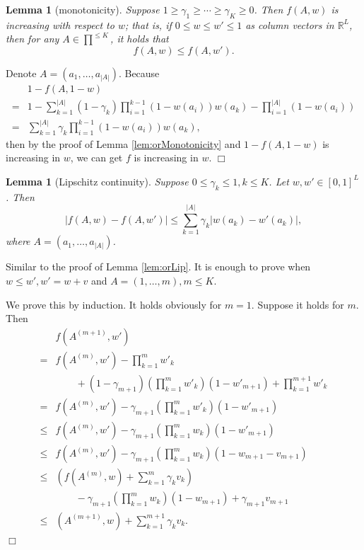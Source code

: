 \documentclass{article}
\newcommand{\RR}{\mathbb{R}}
\newcommand{\abs}[1]{\left| #1 \right|}
\newtheorem{lemma}[theorem]{Lemma}%
\newenvironment{proof}{\noindent {\textbf{Proof. }}}{$\Box$ \medskip}
\begin{document}
\begin{lemma}[monotonicity]
	\label{lem:andMonotonicity}
	Suppose $1 \geq \gamma_1 \geq \cdots \geq \gamma_K \geq 0$. Then $f(A, w)$ is increasing with respect to $w$; that is, if $0 \leq w \leq w' \leq 1$ as column vectors in $\RR^L$, then for any $A \in \prod^{\leq K}$, it holds that
	$$
	f(A, w) \leq f(A, w').
	$$
\end{lemma}
\begin{proof}
	Denote $A = (a_1, \ldots, a_{|A|})$. Because
	\begin{align*}
	&1 - f(A, 1-w) \\
	=& 1- \sum_{k = 1}^{\abs{A}} (1 - \gamma_k) \prod_{i = 1}^{k - 1} (1-w(a_i))w(a_k) - \prod_{i=1}^{\abs{A}}(1-w(a_i))\\
	=& \sum_{k = 1}^{\abs{A}} \gamma_{k} \prod_{i=1}^{k-1} (1 - w(a_i)) w(a_k),
	\end{align*}
	then by the proof of Lemma \ref{lem:orMonotonicity} and $1-f(A,1-w)$ is increasing in $w$, we can get $f$ is increasing in $w$.
\end{proof}

\begin{lemma}[Lipschitz continuity]
	\label{lem:andLip}
	Suppose $0 \leq \gamma_k \leq 1, k \leq K$. Let $w, w'\in [0,1]^{L}$. Then
	$$
	|f(A, w) - f(A, w')| \leq \sum_{k=1}^{|A|} \gamma_k |w(a_k) - w'(a_k)|,
	$$
	where $A = (a_1, \ldots, a_{|A|})$.
\end{lemma}
\begin{proof}
	Similar to the proof of Lemma \ref{lem:orLip}. It is enough to prove when $w \leq w', w' = w + v $ and $A = (1, \ldots, m), m \leq K$.
	
	We prove this by induction. It holds obviously for $m = 1$. Suppose it holds for $m$. Then
	\begin{align*}
		&f(A^{(m+1)}, w') \\
		= &f(A^{(m)}, w') -\prod_{k=1}^{m} w'_k \\
		&\qquad+ (1-\gamma_{m+1}) (\prod_{k=1}^{m} w'_k) (1 - w'_{m+1})+ \prod_{k=1}^{m+1} w'_k\\
		=& f(A^{(m)}, w') - \gamma_{m+1} (\prod_{k=1}^{m} w'_k) (1 - w'_{m+1})\\
		\leq& f(A^{(m)}, w') - \gamma_{m+1} (\prod_{k=1}^{m} w_k) (1 - w'_{m+1})\\
		\leq& f(A^{(m)}, w') -\gamma_{m+1} (\prod_{k=1}^{m} w_k)  (1 - w_{m+1} - v_{m+1})\\
		\leq& (f(A^{(m)}, w) +  \sum_{k=1}^{m} \gamma_k v_k) \\
		&\qquad - \gamma_{m+1}  (\prod_{k=1}^{m} w_k)(1 - w_{m+1}) + \gamma_{m+1} v_{m+1}\\
		\leq& (A^{(m+1)}, w) + \sum_{k=1}^{m+1} \gamma_k v_k.
	\end{align*}
\end{proof}
\end{document}
